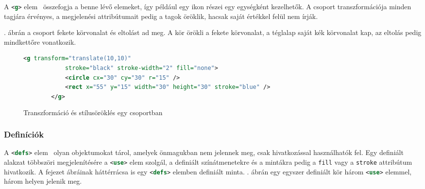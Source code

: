 A \lstinline[language=XML]|<g>| elem~\cite{mdn-g} összefogja a benne lévő elemeket, így például egy ikon részei egy egységként kezelhetők. A csoport transzformációja minden tagjára érvényes, a megjelenési attribútumait pedig a tagok öröklik, hacsak saját értékkel felül nem írják.

. ábrán a csoport fekete körvonalat és eltolást ad meg. A kör örökli a fekete körvonalat, a téglalap saját kék körvonalat kap, az eltolás pedig mindkettőre vonatkozik.

\begin{figure}[H] \centering
    \begin{adjustbox}{valign=m, max width=0.8\textwidth}
        \begin{lstlisting}[language=XML]
        <g transform="translate(10,10)"
            stroke="black" stroke-width="2" fill="none">
            <circle cx="30" cy="30" r="15" />
            <rect x="55" y="15" width="30" height="30" stroke="blue" />
        </g>
        \end{lstlisting}
    \end{adjustbox}
    \hfill
    \begin{adjustbox}{valign=m, max width=0.2\textwidth}
        
    \end{adjustbox}
    \caption{Transzformáció és stílusöröklés egy csoportban}
    \label{fig:example_group}
\end{figure}

\subsubsection{Definíciók}

A \lstinline[language=XML]|<defs>| elem~\cite{mdn-defs} olyan objektumokat tárol, amelyek önmagukban nem jelennek meg, csak hivatkozással használhatók fel. Egy definiált alakzat többszöri megjelenítésére a \lstinline[language=XML]|<use>| elem szolgál, a definiált színátmenetekre és a mintákra pedig a \texttt{fill} vagy a \texttt{stroke} attribútum hivatkozik. A fejezet ábráinak háttérrácsa is egy \lstinline[language=XML]|<defs>| elemben definiált minta. . ábrán egy egyszer definiált kör három \lstinline[language=XML]|<use>| elemmel, három helyen jelenik meg.

